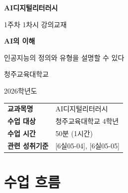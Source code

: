 \documentclass[11pt,a4paper]{article}
\begin{document}
\begin{titlepage}
\centering
\vspace*{3cm}

{\Huge\bfseries\color{primary} AI디지털리터러시}

\vspace{0.5cm}

{\LARGE\color{darkblue} 1주차 1차시 강의교재}

\vspace{1.5cm}

{\Huge\bfseries AI의 이해}

\vspace{0.5cm}

{\Large\color{darkgray} 인공지능의 정의와 유형을 설명할 수 있다}

\vspace{3cm}

{\large 청주교육대학교}

\vspace{0.3cm}

{\large 2026학년도}

\vspace{2cm}

\begin{tcolorbox}[colback=lightblue, colframe=primary, width=0.8\textwidth, halign=center]
\begin{tabular}{ll}
\textbf{교과목명} & AI디지털리터러시 \\
\textbf{수업 대상} & 청주교육대학교 4학년 \\
\textbf{수업 시간} & 50분 \mbox{(1시간)} \\
\textbf{관련 성취기준} & {[6실05-04]}, {[6실05-05]} \\
\end{tabular}
\end{tcolorbox}

\end{titlepage}

\tableofcontents
\newpage

\section*{ 수업 흐름}
\end{document}
